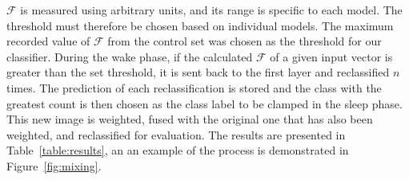 \documentclass{report}
\begin{document}
$\mathcal{F}$ is measured using arbitrary units, and its range is specific to each model. The threshold must therefore be chosen based on individual models. The maximum recorded value of $\mathcal{F}$ from the control set was chosen as the threshold for our classifier. During the wake phase, if the calculated $\mathcal{F}$ of a given input vector is greater than the set threshold, it is sent back to the first layer and reclassified $n$ times. The prediction of each reclassification is stored and the class with the greatest count is then chosen as the class label to be clamped in the sleep phase. This new image is weighted, fused with the original one that has also been weighted, and reclassified for evaluation. The results are presented in Table~\ref{table:results}, an an example of the process is demonstrated in Figure~\ref{fig:mixing}.
\end{document}
